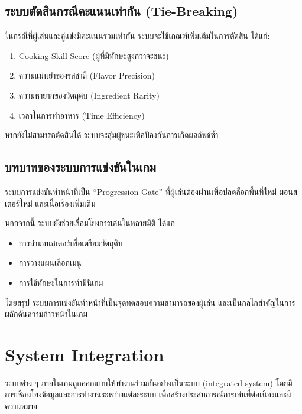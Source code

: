\subsection{ระบบตัดสินกรณีคะแนนเท่ากัน (Tie-Breaking)}

ในกรณีที่ผู้เล่นและคู่แข่งมีคะแนนรวมเท่ากัน ระบบจะใช้เกณฑ์เพิ่มเติมในการตัดสิน ได้แก่:

\begin{enumerate}
\item  Cooking Skill Score (ผู้ที่มีทักษะสูงกว่าจะชนะ)
\item ความแม่นยำของรสชาติ (Flavor Precision)
\item ความหายากของวัตถุดิบ (Ingredient Rarity)
\item เวลาในการทำอาหาร (Time Efficiency)
\end{enumerate}
หากยังไม่สามารถตัดสินได้ ระบบจะสุ่มผู้ชนะเพื่อป้องกันการเกิดผลลัพธ์ซ้ำ

\subsection{บทบาทของระบบการแข่งขันในเกม}

ระบบการแข่งขันทำหน้าที่เป็น ``Progression Gate'' ที่ผู้เล่นต้องผ่านเพื่อปลดล็อกพื้นที่ใหม่ มอนสเตอร์ใหม่ และเนื้อเรื่องเพิ่มเติม

\par\vspace{0.5em}\noindent
นอกจากนี้ ระบบยังช่วยเชื่อมโยงการเล่นในหลายมิติ ได้แก่

\begin{itemize}
\item การล่ามอนสเตอร์เพื่อเตรียมวัตถุดิบ
\item การวางแผนเลือกเมนู
\item การใช้ทักษะในการทำมินิเกม
\end{itemize}
\par\vspace{0.5em}\noindent
โดยสรุป ระบบการแข่งขันทำหน้าที่เป็นจุดทดสอบความสามารถของผู้เล่น และเป็นกลไกสำคัญในการผลักดันความก้าวหน้าในเกม

\section{System Integration}

ระบบต่าง ๆ ภายในเกมถูกออกแบบให้ทำงานร่วมกันอย่างเป็นระบบ (integrated system) โดยมีการเชื่อมโยงข้อมูลและการทำงานระหว่างแต่ละระบบ เพื่อสร้างประสบการณ์การเล่นที่ต่อเนื่องและมีความหมาย

